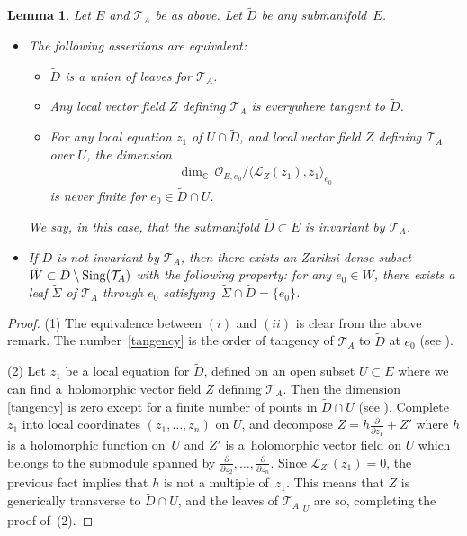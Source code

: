 \documentclass[pdftex]{sigma}
\newcommand{\der}[2]{\frac{\partial #1}{\partial#2}}
\numberwithin{equation}{section}
\newtheorem{Lemma}[Theorem]{Lemma}
\begin{document}
 \begin{Lemma}\label{invariantfoliation}\samepage Let $E$ and $\mathcal{T}_A$ be as above. Let $\tilde{D}$ be any submanifold~$E$.
 \begin{itemize}\itemsep=0pt \item[$(1)$] The following assertions are equivalent:
 \begin{itemize}\itemsep=0pt
\item[$(i)$] $\tilde{D}$ is a union of leaves for $\mathcal{T}_A$.
\item[$(ii)$] Any local vector field $Z$ defining $\mathcal{T}_A$ is everywhere tangent to $\tilde{D}$.
\item[$(iii)$] For any local equation $z_1$ of $U\cap \tilde{D}$, and local vector field $Z$ defining $\mathcal{T}_A$ over $U$, the dimension
 \begin{gather}\label{tangency} \dim_{\mathbb{C}}\, \mathcal{O}_{E,e_0}/\langle \mathcal{L}_{Z}(z_1), z_1 \rangle_{e_0} \end{gather}
is never finite for $e_0 \in \tilde{D}\cap U$.
\end{itemize}
We say, in this case, that the submanifold $\tilde{D}\subset E$ is \textit{invariant} by $\mathcal{T}_A$.
\item[$(2)$] If $\tilde{D}$ is not invariant by $\mathcal{T}_A$, then there exists an Zariksi-dense subset $\tilde{W}\subset \tilde{D}\setminus {\rm Sing}(\mathcal{T}_A)$ with the following property: for any $e_0\in \tilde{W}$, there exists a leaf $\tilde{\Sigma}$ of $\mathcal{T}_A$ through $e_0$ satisfying~$\tilde{\Sigma}\cap \tilde{D} = \{e_0\}$.
\end{itemize}
 \end{Lemma}
\begin{proof}
(1) The equivalence between $(i)$ and $(ii)$ is clear from the above remark. The number~\eqref{tangency} is the order of tangency of $\mathcal{T}_A$ to $\tilde{D}$ at $e_0$ (see \cite[p.~13]{Brunella}).

(2) Let $z_1$ be a local equation for $\tilde{D}$, defined on an open subset $U\subset E$ where we can find a~holomorphic vector field $Z$ defining $\mathcal{T}_A$. Then the dimension \eqref{tangency} is zero except for a finite number of points in $\tilde{D}\cap U$ (see \cite[p.~13]{Brunella}). Complete $z_1$ into local coordinates $(z_1,\dots,z_n)$ on $U$, and decompose $Z=h \der{}{z_1} + Z'$ where $h$ is a holomorphic function on~$U$ and $Z'$ is a~holomorphic vector field on $U$ which belongs to the submodule spanned by $\der{}{z_2},\dots,\der{}{z_n}$. Since $\mathcal{L}_{Z'}(z_1)=0$, the previous fact implies that $h$ is not a multiple of~$z_1$. This means that $Z$ is generically transverse to $\tilde{D}\cap U$, and the leaves of $\mathcal{T}_A\vert_U$ are so, completing the proof of~(2).
 \end{proof}
\end{document}
